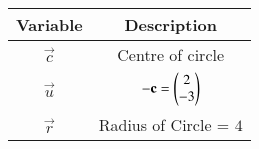 \begin{tabular}[12pt]{ |c| c|}
    \hline
    \textbf{Variable} & \textbf{Description}\\ 
    \hline
	$\vec{c}$ & Centre of circle \\
    \hline
	$\vec{u}$ & $\mathbf{-c}=\begin{pmatrix}2\\-3\end{pmatrix}$\\
	\hline
	$\vec{r}$ & Radius of Circle = $4$\\
	\hline
    \end{tabular}

